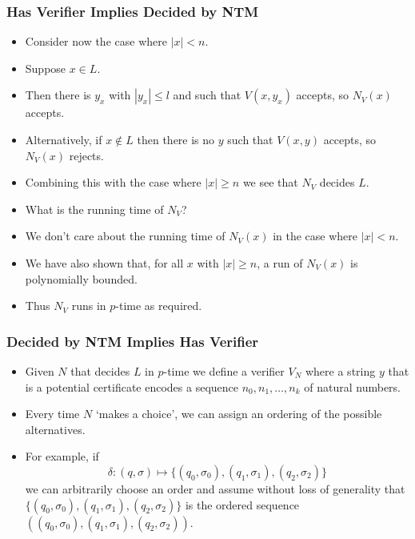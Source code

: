 \documentclass[handout]{beamer}
\begin{document}
\begin{frame}
\frametitle{Has Verifier Implies Decided by NTM}
\begin{itemize}
\item Consider now the case where $|x|<n$. 
\item Suppose $x\in L$. 
\item Then there is $y_x$ with $|y_x|\leq l$ and such that $V(x,y_x)$ accepts, so $N_V(x)$ accepts. 
\item Alternatively, if $x\notin L$ then there is no $y$ such that $V(x,y)$ accepts, so $N_V(x)$ rejects. 
\item Combining this with the case where $|x|\geq n$ we see that $N_V$ decides $L$. 
\item What is the running time of $N_V$?  
\item We don't care about the running time of $N_V(x)$ in the case where $|x|< n$. 
\item We have also shown that, for all $x$ with $|x|\geq n$, a run of $N_V(x)$ is polynomially bounded. 
\item Thus $N_V$ runs in $p$-time as required.
\end{itemize}
\end{frame}

\begin{frame}
\frametitle{Decided by NTM Implies Has Verifier}
\begin{itemize}
\item Given $N$ that decides $L$ in $p$-time we define a verifier $V_N$ where a string $y$ that is a potential certificate encodes a sequence $n_0,n_1,\ldots,n_k$ of natural numbers. 
\vspace{0.5cm}
\item Every time $N$ `makes a choice', we can assign an ordering of the possible alternatives. 
\vspace{0.5cm}
\item For example, if \[\delta:(q,\sigma)\mapsto \{(q_0,\sigma_0), (q_1,\sigma_1), (q_2,\sigma_2)\}\] 
we can arbitrarily choose an order and assume without loss of generality that $\{(q_0,\sigma_0), (q_1,\sigma_1), (q_2,\sigma_2)\}$ is the ordered sequence $((q_0,\sigma_0), (q_1,\sigma_1), (q_2,\sigma_2))$. 
\end{itemize}
\end{frame}
\end{document}
